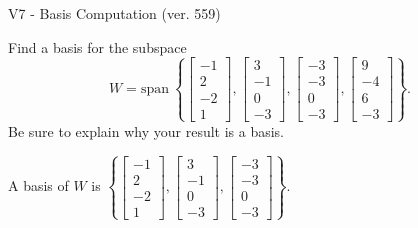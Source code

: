 \begin{exercise}
  \begin{exerciseTitle}V7 - Basis Computation (ver. 559)\end{exerciseTitle}
  \begin{exerciseStatement}
    Find a basis for the subspace 
\[W=\mathrm{span}\ \left\{\left[\begin{array}{r}
-1 \\
2 \\
-2 \\
1
\end{array}\right] , \left[\begin{array}{r}
3 \\
-1 \\
0 \\
-3
\end{array}\right] , \left[\begin{array}{r}
-3 \\
-3 \\
0 \\
-3
\end{array}\right] , \left[\begin{array}{r}
9 \\
-4 \\
6 \\
-3
\end{array}\right]\right\}.\]
 Be sure to explain why your result is a basis.


  \end{exerciseStatement}
  \begin{exerciseAnswer}
   A basis of \(W\) is  \(\left\{\left[\begin{array}{r}
-1 \\
2 \\
-2 \\
1
\end{array}\right] , \left[\begin{array}{r}
3 \\
-1 \\
0 \\
-3
\end{array}\right] , \left[\begin{array}{r}
-3 \\
-3 \\
0 \\
-3
\end{array}\right]\right\}\).
  


  \end{exerciseAnswer}
\end{exercise}